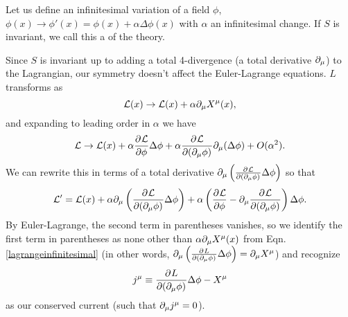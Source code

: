 Let us define an infinitesimal variation of a field $\phi$,
$\phi(x)\to \phi'(x)=\phi(x)+\alpha \Delta \phi(x)$
with $\alpha$ an infinitesimal change. If $S$ is invariant, we call this a  of the theory.

Since $S$ is invariant up to adding a total 4-divergence (a total derivative $\partial_\mu$) to the Lagrangian, our symmetry doesn't affect the Euler-Lagrange equations. $L$ transforms as
\begin{equation}\label{lagrangeinfinitesimal}
\mathcal L(x)\to \mathcal L(x)+\alpha \partial_\mu X^\mu(x),
\end{equation}
and expanding to leading order in $\alpha$ we have
\begin{equation}
\mathcal L\to \mathcal L(x)+\alpha \frac{\partial^{} \mathcal L}{\partial \phi ^{}}\Delta \phi +\alpha \frac{\partial^{} \mathcal L}{\partial (\partial_\mu\phi) ^{}}\partial_\mu(\Delta\phi)+O(\alpha^2).
\end{equation}
We can rewrite this in terms of a total derivative $\partial_\mu\left(\frac{\partial^{} \mathcal L}{\partial (\partial_\mu\phi) ^{}}\Delta \phi\right)$
so that
\begin{equation}
\mathcal L'=\mathcal L(x)+\alpha \partial_\mu\left(\frac{\partial^{} \mathcal L}{\partial (\partial_\mu\phi) ^{}}\Delta \phi\right) +\alpha \left(\frac{\partial^{} \mathcal L}{\partial \phi ^{}}-\partial_\mu \frac{\partial^{} \mathcal L}{\partial (\partial_\mu\phi) ^{}}\right)\Delta \phi.
\end{equation}
By Euler-Lagrange, the second term in parentheses vanishes, so we identify the first term in parentheses as none other than $\alpha \partial_\mu X^\mu(x)$ from Eqn. \ref{lagrangeinfinitesimal} (in other words, $\partial_\mu\left(\frac{\partial^{} L}{\partial (\partial_\mu\phi) ^{}}\Delta \phi\right) =\partial_\mu X^\mu$) and recognize 
\begin{equation}
j^\mu\equiv\frac{\partial^{} L}{\partial (\partial_\mu \phi) ^{}}\Delta \phi -X^\mu
\end{equation} as our conserved current (such that $\partial_\mu j^\mu =0$).

